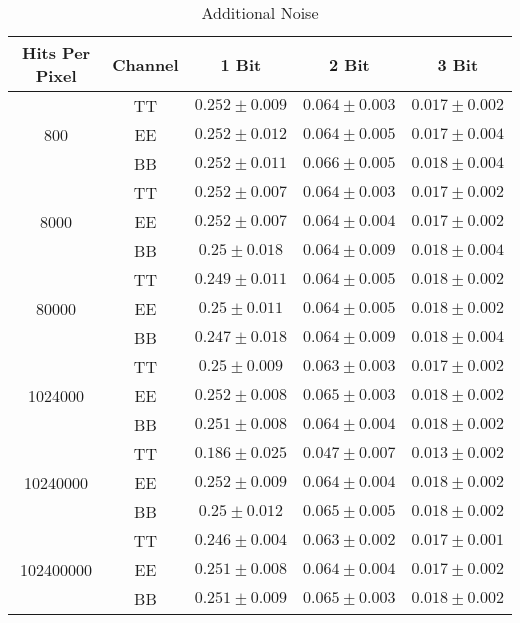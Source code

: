 \documentclass[apj]{emulateapj}
\begin{document}
\def\arraystretch{1.2}
\begin{table*}[tbh]
\begin{center}
\caption{\label{tab:extranoise} Additional Noise}
\small
\begin{tabular}{c c c c c}
Hits Per Pixel & Channel & 1 Bit & 2 Bit & 3 Bit \\
\hline
\hline
\multirow{3}{*}{800}  & TT  & $ 0.252 \pm 0.009 $  & $ 0.064 \pm 0.003 $  & $ 0.017 \pm 0.002 $ \\
& EE  & $ 0.252 \pm 0.012 $  & $ 0.064 \pm 0.005 $  & $ 0.017 \pm 0.004 $ \\
& BB  & $ 0.252 \pm 0.011 $  & $ 0.066 \pm 0.005 $  & $ 0.018 \pm 0.004 $ \\
\hline
\multirow{3}{*}{8000}  & TT  & $ 0.252 \pm 0.007 $  & $ 0.064 \pm 0.003 $  & $ 0.017 \pm 0.002 $ \\
& EE  & $ 0.252 \pm 0.007 $  & $ 0.064 \pm 0.004 $  & $ 0.017 \pm 0.002 $ \\
& BB  & $ 0.25 \pm 0.018 $  & $ 0.064 \pm 0.009 $  & $ 0.018 \pm 0.004 $ \\
\hline
\multirow{3}{*}{80000}  & TT  & $ 0.249 \pm 0.011 $  & $ 0.064 \pm 0.005 $  & $ 0.018 \pm 0.002 $ \\
& EE  & $ 0.25 \pm 0.011 $  & $ 0.064 \pm 0.005 $  & $ 0.018 \pm 0.002 $ \\
& BB  & $ 0.247 \pm 0.018 $  & $ 0.064 \pm 0.009 $  & $ 0.018 \pm 0.004 $ \\
\hline
\multirow{3}{*}{1024000}  & TT  & $ 0.25 \pm 0.009 $  & $ 0.063 \pm 0.003 $  & $ 0.017 \pm 0.002 $ \\
& EE  & $ 0.252 \pm 0.008 $  & $ 0.065 \pm 0.003 $  & $ 0.018 \pm 0.002 $ \\
& BB  & $ 0.251 \pm 0.008 $  & $ 0.064 \pm 0.004 $  & $ 0.018 \pm 0.002 $ \\
\hline
\multirow{3}{*}{10240000}  & TT  & $ 0.186 \pm 0.025 $  & $ 0.047 \pm 0.007 $  & $ 0.013 \pm 0.002 $ \\
& EE  & $ 0.252 \pm 0.009 $  & $ 0.064 \pm 0.004 $  & $ 0.018 \pm 0.002 $ \\
& BB  & $ 0.25 \pm 0.012 $  & $ 0.065 \pm 0.005 $  & $ 0.018 \pm 0.002 $ \\
\hline
\multirow{3}{*}{102400000}  & TT  & $ 0.246 \pm 0.004 $  & $ 0.063 \pm 0.002 $  & $ 0.017 \pm 0.001 $ \\
& EE  & $ 0.251 \pm 0.008 $  & $ 0.064 \pm 0.004 $  & $ 0.017 \pm 0.002 $ \\
& BB  & $ 0.251 \pm 0.009 $  & $ 0.065 \pm 0.003 $  & $ 0.018 \pm 0.002 $ \\
\end{tabular}
 \normalsize
\end{center}
\end{table*}
\end{document}
